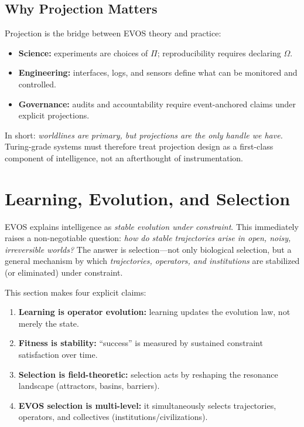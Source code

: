 \documentclass[11pt]{article}
\begin{document}
\subsection{Why Projection Matters}
\label{sec:why-projection}

Projection is the bridge between EVOS theory and practice:

\begin{itemize}
  \item \textbf{Science:} experiments are choices of $\Pi$; reproducibility requires declaring $\Omega$.
  \item \textbf{Engineering:} interfaces, logs, and sensors define what can be monitored and controlled.
  \item \textbf{Governance:} audits and accountability require event-anchored claims under explicit projections.
\end{itemize}

In short: \emph{worldlines are primary, but projections are the only handle we have.}
Turing-grade systems must therefore treat projection design as a first-class component of intelligence,
not an afterthought of instrumentation.

\section{Learning, Evolution, and Selection}
\label{sec:learning-selection}

EVOS explains intelligence as \emph{stable evolution under constraint}. This immediately raises a
non-negotiable question: \emph{how do stable trajectories arise in open, noisy, irreversible worlds?}
The answer is selection---not only biological selection, but a general mechanism by which
\emph{trajectories, operators, and institutions} are stabilized (or eliminated) under constraint.

This section makes four explicit claims:

\begin{enumerate}
  \item \textbf{Learning is operator evolution:} learning updates the evolution law, not merely the state.
  \item \textbf{Fitness is stability:} ``success'' is measured by sustained constraint satisfaction over time.
  \item \textbf{Selection is field-theoretic:} selection acts by reshaping the resonance landscape (attractors, basins, barriers).
  \item \textbf{EVOS selection is multi-level:} it simultaneously selects trajectories, operators, and collectives (institutions/civilizations).
\end{enumerate}
\end{document}
